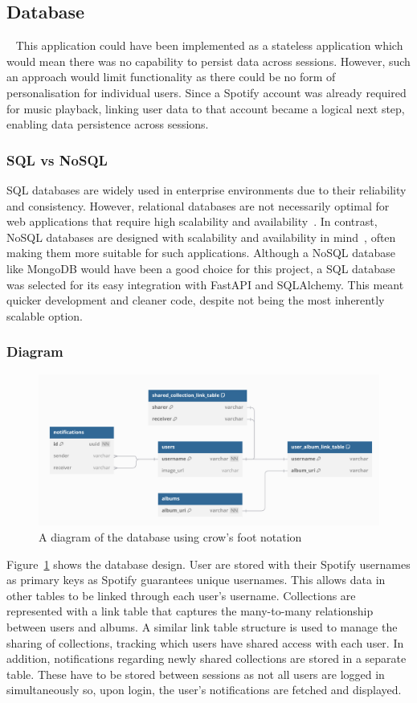 \subsection{Database}~\label{sec:database}
This application could have been implemented as a stateless application which would  mean there was no capability to persist data across sessions. However, such an approach would limit functionality as there could be no form of personalisation for individual users. Since a Spotify account was already required for music playback, linking user data to that account became a logical next step, enabling data persistence across sessions.

\subsubsection{SQL vs NoSQL}
SQL databases are widely used in enterprise environments due to their reliability and consistency. However, relational databases are not necessarily optimal for web applications that require high scalability and availability~\cite{GANESHCHANDRA201513}. In contrast, NoSQL databases are designed with scalability and availability in mind~\cite{NoSQL}, often making them more suitable for such applications.
Although a NoSQL database like MongoDB would have been a good choice for this project, a SQL database was selected for its easy integration with FastAPI and SQLAlchemy. This meant quicker development and cleaner code, despite not being the most inherently scalable option.

\subsubsection{Diagram}
\begin{figure} [H]
    \centering
    \includegraphics[width=0.6\linewidth]{figures/db_diagram.png}
    \caption{A diagram of the database using crow's foot notation}
    \label{fig:database-diagram}
\end{figure}

Figure~\ref{fig:database-diagram} shows the database design. User are stored with their Spotify usernames as primary keys as Spotify guarantees unique usernames. This allows data in other tables to be linked through each user’s username. Collections are represented with a link table that captures the many-to-many relationship between users and albums. A similar link table structure is used to manage the sharing of collections, tracking which users have shared access with each user. In addition, notifications regarding newly shared collections are stored in a separate table. These have to be stored between sessions as not all users are logged in simultaneously so, upon login, the user's notifications are fetched and displayed.

